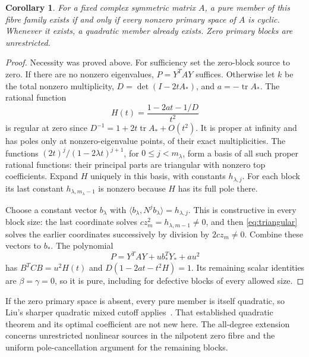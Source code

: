 \documentclass[11pt]{article}
\newtheorem{corollary}[theorem]{Corollary}
\theoremstyle{definition}\newtheorem{definition}[theorem]{Definition}
\theoremstyle{remark}\newtheorem{remark}[theorem]{Remark}
\begin{document}
\begin{corollary}\label{cor:matrixexistence}
For a fixed complex symmetric matrix $A$, a pure member of this
fibre family exists if and only if every nonzero primary space
of $A$ is cyclic. Whenever it exists, a quadratic member already
exists. Zero primary blocks are unrestricted.
\end{corollary}
\begin{proof}
Necessity was proved above. For sufficiency set the zero-block
source to zero. If there are no nonzero eigenvalues,
$P=Y^TAY$ suffices. Otherwise let $k$ be the total nonzero
multiplicity, $D=\det(I-2tA_*)$, and $a=-\operatorname{tr}A_*$.
The rational function
\[
 H(t)=\frac{1-2at-1/D}{t^2}
\]
is regular at zero since $D^{-1}=1+2t\operatorname{tr}A_*+O(t^2)$.
It is proper at infinity and has poles only at nonzero-eigenvalue
points, of their exact multiplicities. The functions
$(2t)^j/(1-2\lambda t)^{j+1}$, for $0\le j<m_\lambda$,
form a basis of all such proper rational functions: their
principal parts are triangular with nonzero top coefficients.
Expand $H$ uniquely in this basis, with constants $h_{\lambda,j}$.
For each block its last constant $h_{\lambda,m_\lambda-1}$
is nonzero because $H$ has its full pole there.

Choose a constant vector $b_\lambda$ with
$\langle b_\lambda,N^jb_\lambda\rangle=h_{\lambda,j}$.
This is constructive in every block size: the last coordinate
solves $c z_m^2=h_{\lambda,m-1}\ne0$, and then
\eqref{eq:triangular} solves the earlier coordinates successively
by division by $2cz_m\ne0$. Combine these vectors to $b_*$.
The polynomial
\[
 P=Y^TAY+u b_*^TY_*+a u^2
\]
has $B^TCB=u^2H(t)$ and
$D(1-2at-t^2H)=1$. Its remaining scalar identities are
$\beta=\gamma=0$, so it is pure, including for defective blocks
of every allowed size.
\end{proof}

If the zero primary space is absent, every pure member is
itself quadratic, so Liu's sharper quadratic mixed cutoff
applies~\cite[Theorems~2.1 and~2.2]{Liu}. That established
quadratic theorem and its optimal coefficient are not new here.
The all-degree extension concerns unrestricted nonlinear sources
in the nilpotent zero fibre and the uniform pole-cancellation
argument for the remaining blocks.
\end{document}
